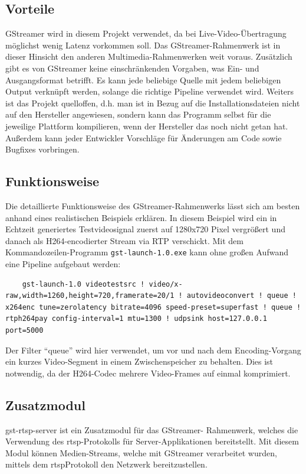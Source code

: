 \subsection{Vorteile}
GStreamer wird in diesem Projekt verwendet, da bei Live-Video-Übertragung möglichst wenig Latenz vorkommen soll.
Das GStreamer-Rahmenwerk ist in dieser Hinsicht den anderen Multimedia-Rahmenwerken weit voraus.
Zusätzlich gibt es von GStreamer keine einschränkenden Vorgaben, was Ein- und Ausgangsformat betrifft.
Es kann jede beliebige Quelle mit jedem beliebigen Output verknüpft werden, solange die richtige Pipeline verwendet wird.
Weiters ist das Projekt quelloffen, d.h. man ist in Bezug auf die Installationsdateien nicht auf den Hersteller angewiesen, sondern kann das Programm selbst für die jeweilige Plattform kompilieren, wenn der Hersteller das noch nicht getan hat.
Außerdem kann jeder Entwickler Vorschläge für Änderungen am Code sowie Bugfixes vorbringen.
\subsection{Funktionsweise}
Die detaillierte Funktionsweise des GStreamer-Rahmenwerks lässt sich am besten anhand eines realistischen Beispiels erklären.
In diesem Beispiel wird ein in Echtzeit generiertes Testvideosignal zuerst auf 1280x720 Pixel vergrößert und danach als H264-encodierter Stream via RTP verschickt.
Mit dem Kommandozeilen-Programm \texttt{gst-launch-1.0.exe} kann ohne großen Aufwand eine Pipeline aufgebaut werden:
\begin{verbatim}
    gst-launch-1.0 videotestsrc ! video/x-raw,width=1260,height=720,framerate=20/1 ! autovideoconvert ! queue ! x264enc tune=zerolatency bitrate=4096 speed-preset=superfast ! queue ! rtph264pay config-interval=1 mtu=1300 ! udpsink host=127.0.0.1 port=5000
\end{verbatim}
Der Filter \enquote{queue} wird hier verwendet, um vor und nach dem Encoding-Vorgang ein kurzes Video-Segment in einem Zwischenspeicher zu behalten. Dies ist notwendig, da der H264-Codec mehrere Video-Frames auf einmal komprimiert.

\subsection{Zusatzmodul}
gst-rtsp-server ist ein Zusatzmodul für das GStreamer- Rahmenwerk, welches die Verwendung des \acs{rtsp}-Protokolls für Server-Applikationen bereitstellt.
Mit diesem Modul können Medien-Streams, welche mit GStreamer verarbeitet wurden, mittels dem \ac{rtsp}Protokoll den Netzwerk bereitzustellen.

